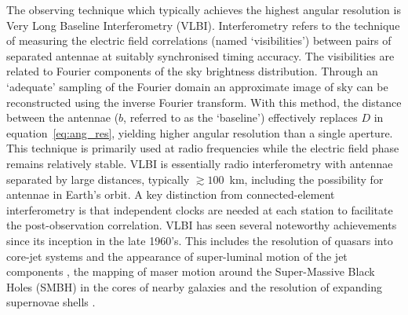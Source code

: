 The observing technique which typically achieves the highest angular resolution is Very Long Baseline Interferometry (VLBI). Interferometry refers to the technique of measuring the electric field correlations (named `visibilities') between pairs of separated antennae at suitably synchronised timing accuracy. The visibilities are related to Fourier components of the sky brightness distribution. Through an `adequate' sampling of the Fourier domain an approximate image of sky can be reconstructed using the inverse Fourier transform. With this method, the distance between the antennae ($b$, referred to as the `baseline') effectively replaces $D$ in equation~\ref{eq:ang_res}, yielding higher angular resolution than a single aperture. This technique is primarily used at radio frequencies while the electric field phase remains relatively stable. VLBI is essentially radio interferometry with antennae separated by large distances, typically $\gtrsim 100$~km, including the possibility for antennae in Earth's orbit. A key distinction from connected-element interferometry is that independent clocks are needed at each station to facilitate the post-observation correlation. VLBI has seen several noteworthy achievements since its inception in the late 1960's. This includes the resolution of quasars into core-jet systems and the appearance of super-luminal motion of the jet components \citep[e.g.][]{Whitney_1971}, the mapping of maser motion around the Super-Massive Black Holes (SMBH) in the cores of nearby galaxies \citep[e.g.][]{Miyoshi_1995} and the resolution of expanding supernovae shells \citep[e.g.][]{Pedlar_1999}.


